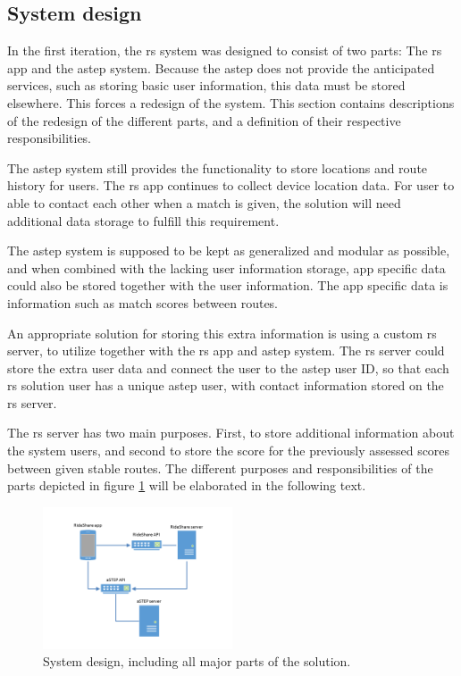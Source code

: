 \subsection{System design}\label{sec:s2systemdesign}
In the first iteration, the \gls{rs} system was designed to consist of two parts: The \gls{rs} app and the \gls{astep} system.
Because the \gls{astep} does not provide the anticipated services, such as storing basic user information, this data must be stored elsewhere.
This forces a redesign of the system.
This section contains descriptions of the redesign of the different parts, and a definition of their respective responsibilities.


The \gls{astep} system still provides the functionality to store locations and route history for users.
The \gls{rs} app continues to collect device location data.  
For user to able to contact each other when a match is given, the solution will need additional data storage to fulfill this requirement.


The \gls{astep} system is supposed to be kept as generalized and modular as possible, and when combined with the lacking user information storage, app specific data could also be stored together with the user information.
The app specific data is information such as match scores between routes.


An appropriate solution for storing this extra information is using a custom \gls{rs} server, to utilize together with the \gls{rs} app and \gls{astep} system.
The \gls{rs} server could store the extra user data and connect the user to the \gls{astep} user ID, so that each \gls{rs} solution user has a unique \gls{astep} user, with contact information stored on the \gls{rs} server.

The \gls{rs} server has two main purposes.
First, to store additional information about the system users, and second to store the score for the previously assessed scores between given stable routes.
The different purposes and responsibilities of the parts depicted in figure \ref{fig:s2systemdesign} will be elaborated in the following text.
\begin{figure}
	\vspace{-12pt}
	\centering
	\includegraphics[width=0.5\textwidth,trim={4cm 2cm 4cm 2cm},clip]{figures/SystemDesign.png}
	\caption{System design, including all major parts of the solution.}
	\vspace{-12pt}
	\label{fig:s2systemdesign}
\end{figure}

